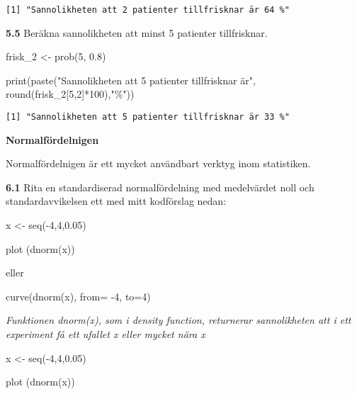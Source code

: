 \documentclass[
  letterpaper,
  DIV=11,
  numbers=noendperiod]{scrartcl}
\newenvironment{Shaded}{\begin{snugshade}}{\end{snugshade}}
\newcommand{\DecValTok}[1]{\textcolor[rgb]{0.68,0.00,0.00}{#1}}
\newcommand{\FloatTok}[1]{\textcolor[rgb]{0.68,0.00,0.00}{#1}}
\newcommand{\FunctionTok}[1]{\textcolor[rgb]{0.28,0.35,0.67}{#1}}
\newcommand{\NormalTok}[1]{\textcolor[rgb]{0.00,0.23,0.31}{#1}}
\newcommand{\OtherTok}[1]{\textcolor[rgb]{0.00,0.23,0.31}{#1}}
\newcommand{\SpecialCharTok}[1]{\textcolor[rgb]{0.37,0.37,0.37}{#1}}
\newcommand{\StringTok}[1]{\textcolor[rgb]{0.13,0.47,0.30}{#1}}
\begin{document}
\begin{verbatim}
[1] "Sannolikheten att 2 patienter tillfrisknar är 64 %"
\end{verbatim}

\textbf{5.5} Beräkna sannolikheten att minst 5 patienter tillfrisknar.

\begin{Shaded}
\begin{Highlighting}[]
\NormalTok{frisk\_2 }\OtherTok{\textless{}{-}} \FunctionTok{prob}\NormalTok{(}\DecValTok{5}\NormalTok{, }\FloatTok{0.8}\NormalTok{)}

\FunctionTok{print}\NormalTok{(}\FunctionTok{paste}\NormalTok{(}\StringTok{"Sannolikheten att 5 patienter tillfrisknar är"}\NormalTok{, }\FunctionTok{round}\NormalTok{(frisk\_2[}\DecValTok{5}\NormalTok{,}\DecValTok{2}\NormalTok{]}\SpecialCharTok{*}\DecValTok{100}\NormalTok{),}\StringTok{"\%"}\NormalTok{))}
\end{Highlighting}
\end{Shaded}

\begin{verbatim}
[1] "Sannolikheten att 5 patienter tillfrisknar är 33 %"
\end{verbatim}

\textbf{Normalfördelnigen}

Normalfördelnigen är ett mycket användbart verktyg inom statistiken.

\textbf{6.1} Rita en standardiserad normalfördelning med medelvärdet
noll och standardavvikelsen ett med mitt kodförslag nedan:

x \textless- seq(-4,4,0.05)

plot (dnorm(x))

eller

curve(dnorm(x), from= -4, to=4)

\emph{Funktionen dnorm(x), som i density function, returnerar
sannolikheten att i ett experiment få ett ufallet x eller mycket nära x}

\begin{Shaded}
\begin{Highlighting}[]
\NormalTok{x }\OtherTok{\textless{}{-}} \FunctionTok{seq}\NormalTok{(}\SpecialCharTok{{-}}\DecValTok{4}\NormalTok{,}\DecValTok{4}\NormalTok{,}\FloatTok{0.05}\NormalTok{)}

\FunctionTok{plot}\NormalTok{ (}\FunctionTok{dnorm}\NormalTok{(x))}
\end{Highlighting}
\end{Shaded}
\end{document}
